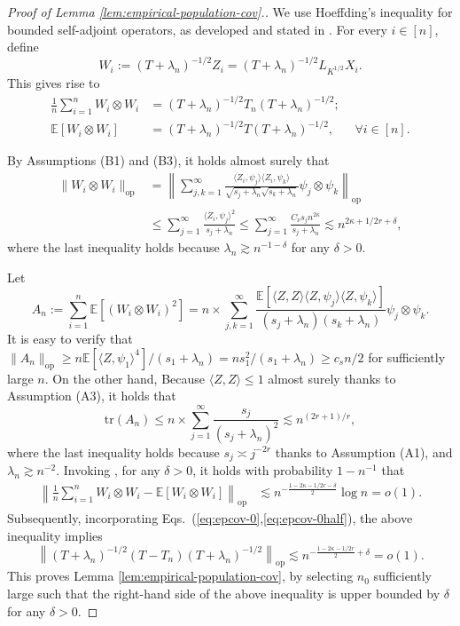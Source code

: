 \documentclass[11pt,a4paper]{article}
\newcommand{\tr}{\mathrm{tr}}
\theoremstyle{definition}
\theoremstyle{plain}
\theoremstyle{remark}
\newcommand{\op}{\mathrm{op}}
\begin{document}
\begin{proof}[Proof of Lemma \ref{lem:empirical-population-cov}.]
We use Hoeffding's inequality for bounded self-adjoint operators, as developed and stated in \citep{minsker2017some}.
For every $i\in[n]$, define
$$
W_i := (T+\lambda_n)^{-1/2}Z_i = (T+\lambda_n)^{-1/2}L_{K^{1/2}}X_i.
$$
This gives rise to
\begin{align}
\frac{1}{n}\sum_{i=1}^n W_i\otimes W_i &= (T+\lambda_n )^{-1/2}T_n (T+\lambda_n )^{-1/2};\label{eq:epcov-0}\\
\mathbb E[W_i\otimes W_i] &= (T+\lambda_n)^{-1/2} T (T+\lambda_n )^{-1/2}, \;\;\;\;\;\;\forall i\in[n]\label{eq:epcov-0half}.
\end{align}

By Assumptions (B1) and (B3), it holds almost surely that 
\begin{align}
\|W_i\otimes W_i\|_\op&=\left\|\sum_{j,k=1}^{\infty}\frac{\langle Z_i,\psi_j\rangle\langle Z_i,\psi_k\rangle}{\sqrt{s_j+\lambda_n}\sqrt{s_k+\lambda_n}}\psi_j\otimes\psi_k\right\|_\op\nonumber\\
&\leq \sum_{j=1}^{\infty}\frac{\langle Z_i,\psi_j\rangle^2}{s_j+\lambda_n} \leq \sum_{j=1}^{\infty} \frac{C_\nu s_j n^{2\kappa}}{s_j+\lambda_n}  \lesssim n^{2\kappa+1/2r+\delta},
\label{eq:proof-epcov-1}
\end{align}
where the last inequality holds because $\lambda_n\gtrsim n^{-1-\delta}$ for any $\delta>0$.

Let 
$$
A_n := \sum_{i=1}^n\mathbb E[(W_i\otimes W_i)^2] =n\times\sum_{j,k=1}^{\infty}\frac{\mathbb E[\langle Z,Z\rangle\langle Z,\psi_j\rangle\langle Z,\psi_k\rangle]}{(s_j+\lambda_n)(s_k+\lambda_n)}\psi_j\otimes \psi_k.
$$
It is easy to verify that $\|A_n\|_\op \geq n\mathbb E[\langle Z,\psi_1\rangle^4]/(s_1+\lambda_n)=ns_1^2/(s_1+\lambda_n)\geq c_sn/2$ for sufficiently large $n$. 
On the other hand, Because $\langle Z,Z\rangle\leq 1$ almost surely thanks to Assumption (A3), it holds that
\begin{equation}
\tr(A_n) \leq n\times \sum_{j=1}^{\infty} \frac{s_j}{(s_j+\lambda_n)^2} \lesssim n^{(2r+1)/r},
\label{eq:proof-epcov-2}
\end{equation}
where the last inequality holds because $s_j\asymp j^{-2r}$ thanks to Assumption (A1), and $\lambda_n\gtrsim n^{-2}$.
Invoking \citep[Theorem 3.1]{minsker2017some}, for any $\delta>0$, it holds with probability $1-n^{-1}$ that
\begin{align*}
\left\|\frac{1}{n}\sum_{i=1}^n W_i\otimes W_i-\mathbb E[W_i\otimes W_i]\right\|_\op &\lesssim n^{-\frac{1-2\kappa-1/2r-\delta}{2}}\log n = o(1). 
\end{align*}
Subsequently, incorporating Eqs.~(\ref{eq:epcov-0},\ref{eq:epcov-0half}), the above inequality implies
$$
\left\|(T+\lambda_n)^{-1/2}(T-T_n)(T+\lambda_n)^{-1/2}\right\|_\op \lesssim n^{-\frac{1-2\kappa-1/2r}{2}+\delta} = o(1).
$$
This proves Lemma \ref{lem:empirical-population-cov}, by selecting $n_0$ sufficiently large such that the right-hand side of the above inequality is upper bounded by $\delta$ for any $\delta>0$.
\end{proof}
\end{document}
